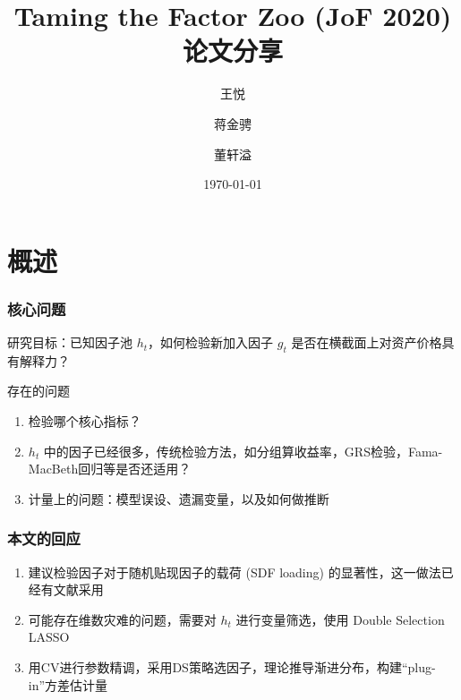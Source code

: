 \documentclass[
  UTF8,
  xcolor={dvipsnames,rgb},
  hyperref={colorlinks, citecolor=orange, linkcolor=black},
  aspectratio=169
  ]{beamer}
\title{Taming the Factor Zoo (JoF 2020) 论文分享}
\date{\today}
\author{王悦 \and 蒋金骋 \and 董轩溢}
\institute{金融机器学习第一组}
\begin{document}
\begin{frame}
    \maketitle
\end{frame}

\begin{frame}
    \tableofcontents
\end{frame}

\section{概述}

\begin{frame}
    \frametitle{核心问题}

    \begin{wideitemize}
        \item 研究目标：已知因子池 \(h_{t}\)，如何检验新加入因子 \(g_{t}\) 是否在横截面上对资产价格具有解释力？
        \item 存在的问题 \begin{enumerate}
            \item 检验哪个核心指标？
            \item \(h_{t}\) 中的因子已经很多，传统检验方法，如分组算收益率\parencite{FamaJournalofFinancialEconomics1993}，GRS检验\parencite{GibbonsEconometrica1989}，Fama-MacBeth回归\parencite{FamaJ.Polit.Econ.1973}等是否还适用？
            \item 计量上的问题：模型误设、遗漏变量，以及如何做推断
        \end{enumerate}
    \end{wideitemize}
\end{frame}

\begin{frame}
    \frametitle{本文的回应}
    \begin{enumerate}
        \item \textcite{Cochrane2009,CochraneTheJournalofFinance2011}建议检验因子对于随机贴现因子的载荷 (SDF loading) 的显著性，这一做法已经有文献采用\parencite{KozakTheJournalofFinance2018,KozakJournalofFinancialEconomics2020}
        \item 可能存在维数灾难的问题，需要对 \(h_{t}\) 进行变量筛选，使用 Double Selection LASSO\parencite{BelloniTheReviewofEconomicStudies2014}
        \item 用CV进行参数精调，采用DS策略选因子，理论推导渐进分布，构建``plug-in''方差估计量
    \end{enumerate}
\end{frame}
\end{document}
